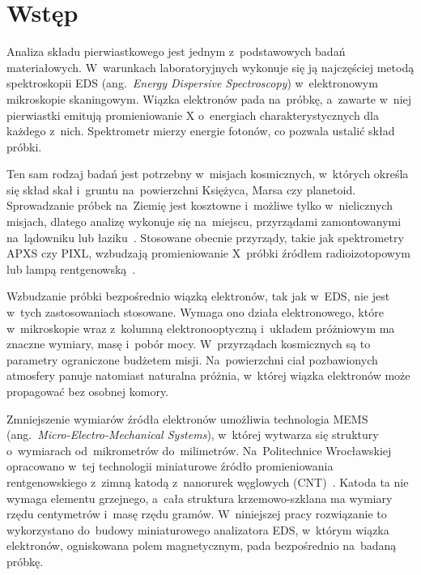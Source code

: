 \chapter{Wstęp}

Analiza składu pierwiastkowego jest jednym z~podstawowych badań
materiałowych. W~warunkach laboratoryjnych wykonuje się ją najczęściej
metodą spektroskopii EDS (ang.~\textit{Energy Dispersive Spectroscopy})
w~elektronowym mikroskopie skaningowym. Wiązka elektronów pada
na~próbkę, a~zawarte w~niej pierwiastki emitują promieniowanie X
o~energiach charakterystycznych dla każdego z~nich. Spektrometr mierzy
energie fotonów, co pozwala ustalić skład próbki.

Ten sam rodzaj badań jest potrzebny w~misjach kosmicznych, w~których
określa się skład skał i~gruntu na~powierzchni Księżyca, Marsa czy
planetoid. Sprowadzanie próbek na~Ziemię jest kosztowne i~możliwe tylko
w~nielicznych misjach, dlatego analizę wykonuje się na~miejscu,
przyrządami zamontowanymi na~lądowniku lub łaziku~\cite{TODO-insitu}.
Stosowane obecnie przyrządy, takie jak spektrometry APXS czy PIXL,
wzbudzają promieniowanie X~próbki źródłem radioizotopowym lub lampą
rentgenowską~\cite{TODO-apxs,TODO-pixl}.

Wzbudzanie próbki bezpośrednio wiązką elektronów, tak jak w~EDS,
nie jest w~tych zastosowaniach stosowane. Wymaga ono działa
elektronowego, które w~mikroskopie wraz z~kolumną elektronooptyczną
i~układem próżniowym ma znaczne wymiary, masę i~pobór mocy.
W~przyrządach kosmicznych są to parametry ograniczone budżetem misji.
Na~powierzchni ciał pozbawionych atmosfery panuje natomiast naturalna
próżnia, w~której wiązka elektronów może propagować bez osobnej komory.

Zmniejszenie wymiarów źródła elektronów umożliwia technologia MEMS
(ang.~\textit{Micro-Electro-Mechanical Systems}), w~której wytwarza się
struktury o~wymiarach od~mikrometrów do~milimetrów. Na~Politechnice
Wrocławskiej opracowano w~tej technologii miniaturowe źródło
promieniowania rentgenowskiego z~zimną katodą z~nanorurek węglowych
(CNT)~\cite{TODO-urbanski}. Katoda ta nie wymaga elementu grzejnego,
a~cała struktura krzemowo-szklana ma wymiary rzędu centymetrów i~masę
rzędu gramów. W~niniejszej pracy rozwiązanie to wykorzystano do~budowy
miniaturowego analizatora EDS, w~którym wiązka elektronów,
ogniskowana polem magnetycznym, pada bezpośrednio na~badaną próbkę.

